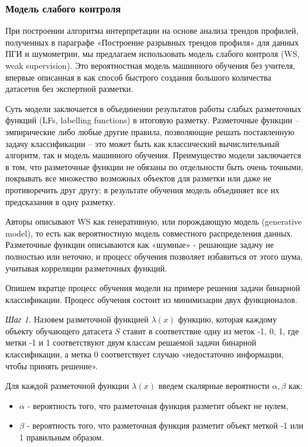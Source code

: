 \subsubsection{Модель слабого контроля}
\par
При построении алгоритма интерпретации на основе анализа трендов профилей, полученных в параграфе «Построение разрывных трендов профиля» для данных ПГИ и шумометрии, мы предлагаем использовать модель слабого контроля (WS, weak supervision). Это вероятностная модель машинного обучения без учителя, впервые описанная в \cite{ws} как способ быстрого создания большого количества датасетов без экспертной разметки.
\par
Суть модели заключается в объединении результатов работы слабых разметочных функций (LFs, labelling functions) в итоговую разметку. Разметочные функции – эмпирические либо любые другие правила, позволяющие решать поставленную задачу классификации – это может быть как классический вычислительный алгоритм, так и модель машинного обучения. Преимущество модели заключается в том, что разметочные функции не обязаны по отдельности быть очень точными, покрывать все множество возможных объектов для разметки или даже не противоречить друг другу; в результате обучения модель объединяет все их предсказания в одну разметку.
\par
Авторы \cite{ws} описывают WS как генеративную, или порождающую модель (generative model), то есть как вероятностную модель совместного распределения данных. Разметочные функции описываются как «шумные» - решающие задачу не полностью или неточно, и процесс обучения позволяет избавиться от этого шума, учитывая корреляции разметочных функций.
\par
Опишем вкратце процесс обучения модели на примере решения задачи бинарной классификации. Процесс обучения состоит из минимизации двух функционалов.
\par
\textit{Шаг 1.}
Назовем разметочной функцией $\lambda (x)$ функцию, которая каждому объекту обучающего датасета $S$ ставит в соответствие одну из меток {-1, 0, 1}, где метки -1 и 1 соответствуют двум классам решаемой задачи бинарной классификации, а метка 0 соответствует случаю «недостаточно информации, чтобы принять решение».
\par
Для каждой разметочной функции $\lambda (x)$ введем скалярные вероятности $\alpha, \beta$ как:
\begin{itemize}
    \item[] $\alpha$ - вероятность того, что разметочная функция разметит объект не нулем,
    \item[] $\beta$ - вероятность того, что разметочная функция разметит объект меткой -1 или 1 правильным образом.
\end{itemize}
